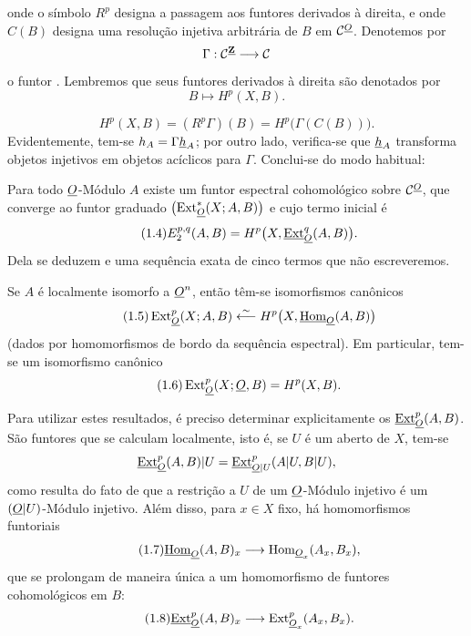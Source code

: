 onde o símbolo $R^{p}$ designa a passagem aos funtores derivados à direita, e onde
$C(B)$ designa uma resolução injetiva arbitrária de $B$ em $\mathcal C^{\underline{O}}$.
Denotemos por
\[
  \Gamma:\mathcal C^{\underline{\mathbf Z}}\longrightarrow\mathcal C
\]
o funtor . Lembremos que seus funtores derivados à direita são
denotados por
\[
  B\longmapsto H^{p}(X,B).
\]

\begin{equation}\tag{1.3}
  H^{p}(X,B)=(R^{p}\Gamma)(B)=H^{p}\bigl(\Gamma(C(B))\bigr).
\end{equation}
Evidentemente, tem-se $h_A=\Gamma\underline{h}_A$; por outro lado, verifica-se que $\underline{h}_A$
transforma objetos injetivos em objetos acíclicos para $\Gamma$. Conclui-se do
modo habitual:

 Para todo $\underline{O}$-Módulo $A$ existe um funtor
espectral cohomológico sobre $\mathcal C^{\underline{O}}$, que converge ao funtor graduado
$\bigl(\operatorname{Ext}_{\underline{O}}^{*}(X;A,B)\bigr)$ e cujo termo inicial é
\begin{equation}\tag{1.4}
  E_{2}^{p,q}(A,B)=H^{p}\bigl(X,\underline{\operatorname{Ext}}_{\underline{O}}^{q}(A,B)\bigr).
\end{equation}
Dela se deduzem  e uma sequência exata de cinco termos
que não escreveremos.

 Se $A$ é localmente isomorfo a $\underline{O}^{n}$, então têm-se
isomorfismos canônicos
\begin{equation}\tag{1.5}
  \operatorname{Ext}_{\underline{O}}^{p}(X;A,B)
  \overset{\sim}{\longleftarrow}
  H^{p}\bigl(X,\underline{\operatorname{Hom}}_{\underline{O}}(A,B)\bigr)
\end{equation}
(dados por homomorfismos de bordo da sequência espectral). Em particular, tem-se
um isomorfismo canônico
\begin{equation}\tag{1.6}
  \operatorname{Ext}_{\underline{O}}^{p}(X;\underline{O},B)=H^{p}(X,B).
\end{equation}

Para utilizar estes resultados, é preciso determinar explicitamente os
$\underline{\operatorname{Ext}}_{\underline{O}}^{p}(A,B)$. São funtores que se calculam localmente,
isto é, se $U$ é um aberto de $X$, tem-se
\[
  \underline{\operatorname{Ext}}_{\underline{O}}^{p}(A,B)|U
  =\underline{\operatorname{Ext}}_{\underline{O}|U}^{p}(A|U,B|U),
\]
como resulta do fato de que a restrição a $U$ de um $\underline{O}$-Módulo injetivo
é um $(\underline{O}|U)$-Módulo injetivo. Além disso, para $x\in X$ fixo, há homomorfismos funtoriais
\begin{equation}\tag{1.7}
  \underline{\operatorname{Hom}}_{\underline{O}}(A,B)_x
  \longrightarrow
  \operatorname{Hom}_{\underline{O}_x}(A_x,B_x),
\end{equation}
que se prolongam de maneira única a um homomorfismo de funtores cohomológicos
em $B$:
\begin{equation}\tag{1.8}
  \underline{\operatorname{Ext}}_{\underline{O}}^{p}(A,B)_x
  \longrightarrow
  \operatorname{Ext}_{\underline{O}_x}^{p}(A_x,B_x).
\end{equation}

